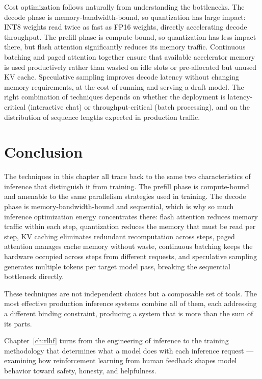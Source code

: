 \documentclass{book}
\begin{document}
Cost optimization follows naturally from understanding the bottlenecks.
The decode phase is memory-bandwidth-bound, so quantization has large
impact: INT8 weights read twice as fast as FP16 weights, directly
accelerating decode throughput. The prefill phase is compute-bound,
so quantization has less impact there, but flash attention significantly
reduces its memory traffic. Continuous batching and paged attention
together ensure that available accelerator memory is used productively
rather than wasted on idle slots or pre-allocated but unused KV cache.
Speculative sampling improves decode latency without changing memory
requirements, at the cost of running and serving a draft model. The
right combination of techniques depends on whether the deployment is
latency-critical (interactive chat) or throughput-critical (batch
processing), and on the distribution of sequence lengths expected in
production traffic.

\section{Conclusion}
\label{sec:inference_conclusion}

The techniques in this chapter all trace back to the same two
characteristics of inference that distinguish it from training. The prefill
phase is compute-bound and amenable to the same parallelism strategies used
in training. The decode phase is memory-bandwidth-bound and sequential,
which is why so much inference optimization energy concentrates there:
flash attention reduces memory traffic within each step, quantization
reduces the memory that must be read per step, KV caching eliminates
redundant recomputation across steps, paged attention manages cache memory
without waste, continuous batching keeps the hardware occupied across
steps from different requests, and speculative sampling generates multiple
tokens per target model pass, breaking the sequential bottleneck directly.

These techniques are not independent choices but a composable set of
tools. The most effective production inference systems combine all of them,
each addressing a different binding constraint, producing a system that
is more than the sum of its parts.

Chapter~\ref{ch:rlhf} turns from the engineering of inference to the
training methodology that determines what a model does with each inference
request --- examining how reinforcement learning from human feedback shapes
model behavior toward safety, honesty, and helpfulness.
\end{document}
